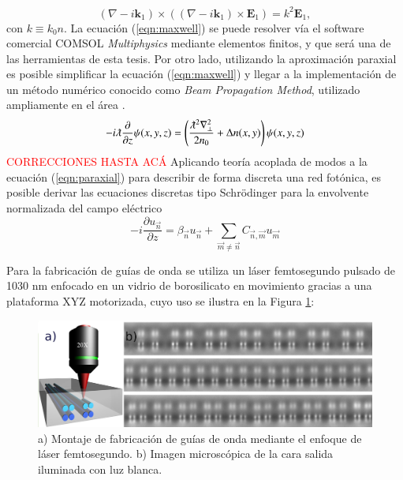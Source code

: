\documentclass{article}
\begin{document}
\begin{equation}
	(\nabla-i\textbf{k}_1)\times((\nabla-i\textbf{k}_1)\times \textbf{E}_1) = k^2 \textbf{E}_1,
	 \label{eqn:maxwell}
\end{equation}
con $k \equiv k_0 n$.
La ecuación (\ref{eqn:maxwell}) se puede resolver vía el software comercial COMSOL \textit{Multiphysics} mediante elementos finitos, y que será una de las herramientas de esta tesis. Por otro lado, utilizando la aproximación paraxial es posible simplificar la ecuación (\ref{eqn:maxwell}) y llegar a la implementación de un método numérico conocido como \textit{Beam Propagation Method}, utilizado ampliamente en el área \cite{bics, interorbital, OAMCaging, vortex, bpm}.
\begin{equation}
	-i\lambdabar\frac{\partial}{\partial z}\psi(x,y,z) = \left(\frac{\lambdabar^2\nabla_\perp^2}{2n_0} + \Delta n(x,y)\right) \psi (x,y,z) \label{eqn:paraxial}
\end{equation}
\textcolor{red}{CORRECCIONES HASTA ACÁ}
Aplicando teoría acoplada de modos \cite{coupledmodetheory} a la ecuación (\ref{eqn:paraxial}) para describir de forma discreta una red fotónica, es posible derivar las ecuaciones discretas tipo Schrödinger para la envolvente normalizada del campo eléctrico \cite{discretesolitons, artificialFB, FBdynamics}
\begin{equation}
	-i\frac{\partial u_{\vec{n}} }{\partial z} = \beta_{\vec{n}}u_{\vec{n}} + \sum_{\vec{m}\neq\vec{n}} C_{\vec{n},\vec{m}}u_{\vec{m}} \label{eqn:CMT}
\end{equation}

Para la fabricación de guías de onda se utiliza un láser femtosegundo pulsado de 1030 nm enfocado en un vidrio de borosilicato en movimiento gracias a una plataforma XYZ motorizada, cuyo uso se ilustra en la Figura \ref{fig:femtosetup}: 

\begin{figure}[H]
	\centering
	\includegraphics[width=0.9\linewidth]{./media/femtosetup.png}
	\caption{a) Montaje de fabricación de guías de onda mediante el enfoque de láser femtosegundo. b)      Imagen microscópica de la cara salida iluminada con luz blanca. \label{fig:femtosetup}}
\end{figure}
\end{document}
